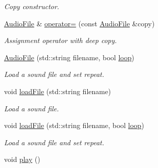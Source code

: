 \begin{DoxyCompactItemize}
\begin{DoxyCompactList}\small\item\em Copy constructor. \item\end{DoxyCompactList}\item 
\hypertarget{class_f2_c_1_1_audio_file_a32b84772abce2a480a5fcc1180ec71b2}{
\hyperlink{class_f2_c_1_1_audio_file}{AudioFile} \& \hyperlink{class_f2_c_1_1_audio_file_a32b84772abce2a480a5fcc1180ec71b2}{operator=} (const \hyperlink{class_f2_c_1_1_audio_file}{AudioFile} \&copy)}
\label{class_f2_c_1_1_audio_file_a32b84772abce2a480a5fcc1180ec71b2}

\begin{DoxyCompactList}\small\item\em Assignment operator with deep copy. \item\end{DoxyCompactList}\item 
\hyperlink{class_f2_c_1_1_audio_file_ac366bc555c69c7e6631747cf3b22af1d}{AudioFile} (std::string filename, bool \hyperlink{class_f2_c_1_1_audio_file_a056116d003867cd170543451619ee661}{loop})
\begin{DoxyCompactList}\small\item\em Load a sound file and set repeat. \item\end{DoxyCompactList}\item 
void \hyperlink{class_f2_c_1_1_audio_file_af30d1dfd6c5f6d1fbfef9749dcab4122}{loadFile} (std::string filename)
\begin{DoxyCompactList}\small\item\em Load a sound file. \item\end{DoxyCompactList}\item 
void \hyperlink{class_f2_c_1_1_audio_file_a4c9c159b5e53f48d5c11e583eabebf3c}{loadFile} (std::string filename, bool \hyperlink{class_f2_c_1_1_audio_file_a056116d003867cd170543451619ee661}{loop})
\begin{DoxyCompactList}\small\item\em Load a sound file and set repeat. \item\end{DoxyCompactList}\item 
\hypertarget{class_f2_c_1_1_audio_file_a114e5b9929dfcd1ad528d8ff99639b23}{
void \hyperlink{class_f2_c_1_1_audio_file_a114e5b9929dfcd1ad528d8ff99639b23}{play} ()}
\label{class_f2_c_1_1_audio_file_a114e5b9929dfcd1ad528d8ff99639b23}


\end{DoxyCompactItemize}
